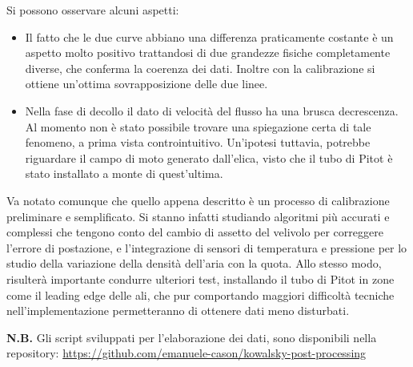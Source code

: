 \documentclass[12pt]{article}
\begin{document}
\noindent
Si possono osservare alcuni aspetti:
\begin{itemize}
\item Il fatto che le due curve abbiano una differenza praticamente costante è un aspetto molto positivo trattandosi di due grandezze fisiche completamente diverse, che conferma la coerenza dei dati. Inoltre con la calibrazione si ottiene un'ottima sovrapposizione delle due linee.
\item Nella fase di decollo il dato di velocità del flusso ha una brusca decrescenza. Al momento non è stato possibile trovare una spiegazione certa di tale fenomeno, a prima vista controintuitivo. Un'ipotesi tuttavia, potrebbe riguardare il campo di moto generato dall'elica, visto che il tubo di Pitot è stato installato a monte di quest'ultima.
\end{itemize}

\noindent
Va notato comunque che quello appena descritto è un processo di calibrazione preliminare e semplificato. Si stanno infatti studiando algoritmi più accurati e complessi che tengono conto del cambio di assetto del velivolo per correggere l'errore di postazione, e l'integrazione di sensori di temperatura e pressione per lo studio della variazione della densità dell'aria con la quota. Allo stesso modo, risulterà importante condurre ulteriori test, installando il tubo di Pitot in zone come il leading edge delle ali, che pur comportando maggiori difficoltà tecniche nell'implementazione permetteranno di ottenere dati meno disturbati.
\newpage



\noindent
\textbf{N.B.} Gli script sviluppati per l'elaborazione dei dati, sono disponibili nella repository: \url{https://github.com/emanuele-cason/kowalsky-post-processing}
\end{document}
